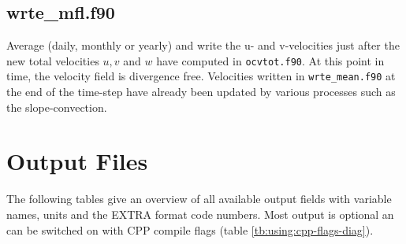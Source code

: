 \subsection{wrte\_mfl.f90}
\label{sec:diagnostic:subroutines:wrte-mfl}

Average (daily, monthly or yearly) and write the u- and v-velocities just after
the new total velocities $u, v$ and $w$ have computed in \texttt{ocvtot.f90}.
At this point in time, the velocity field is divergence free. Velocities written
in  \texttt{wrte\_mean.f90} at the end of the time-step have already been updated by various processes
such as the slope-convection.


\section[Output Files]
{\Large{\bf Output Files}}
\label{sec:diagnostic:output}

The following tables give an overview of all available output fields with variable names, units and the
EXTRA format code numbers. Most output is optional an can be switched on with CPP compile flags
(table \ref{tb:using:cpp-flags-diag}).

